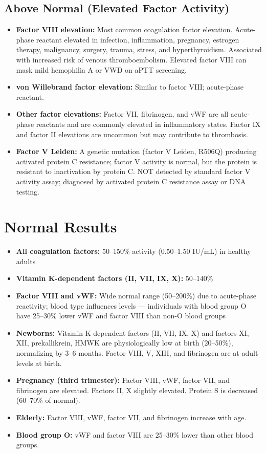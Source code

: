 \subsection*{Above Normal (Elevated Factor Activity)}
\begin{itemize}
  \item \textbf{Factor VIII elevation:} Most common coagulation factor elevation. Acute-phase reactant elevated in infection, inflammation, pregnancy, estrogen therapy, malignancy, surgery, trauma, stress, and hyperthyroidism. Associated with increased risk of venous thromboembolism. Elevated factor VIII can mask mild hemophilia A or VWD on aPTT screening.
  \item \textbf{von Willebrand factor elevation:} Similar to factor VIII; acute-phase reactant.
  \item \textbf{Other factor elevations:} Factor VII, fibrinogen, and vWF are all acute-phase reactants and are commonly elevated in inflammatory states. Factor IX and factor II elevations are uncommon but may contribute to thrombosis.
  \item \textbf{Factor V Leiden:} A genetic mutation (factor V Leiden, R506Q) producing activated protein C resistance; factor V activity is normal, but the protein is resistant to inactivation by protein C. NOT detected by standard factor V activity assay; diagnosed by activated protein C resistance assay or DNA testing.
\end{itemize}

\section*{Normal Results}
\begin{itemize}
  \item \textbf{All coagulation factors:} 50--150\% activity (0.50--1.50 IU/mL) in healthy adults \cite{wallach2022interpretation,fischbach2023manual}
  \item \textbf{Vitamin K-dependent factors (II, VII, IX, X):} 50--140\%
  \item \textbf{Factor VIII and vWF:} Wide normal range (50--200\%) due to acute-phase reactivity; blood type influences levels --- individuals with blood group O have 25--30\% lower vWF and factor VIII than non-O blood groups
  \item \textbf{Newborns:} Vitamin K-dependent factors (II, VII, IX, X) and factors XI, XII, prekallikrein, HMWK are physiologically low at birth (20--50\%), normalizing by 3--6 months. Factor VIII, V, XIII, and fibrinogen are at adult levels at birth.
  \item \textbf{Pregnancy (third trimester):} Factor VIII, vWF, factor VII, and fibrinogen are elevated. Factors II, X slightly elevated. Protein S is decreased (60--70\% of normal).
  \item \textbf{Elderly:} Factor VIII, vWF, factor VII, and fibrinogen increase with age.
  \item \textbf{Blood group O:} vWF and factor VIII are 25--30\% lower than other blood groups.
\end{itemize}

